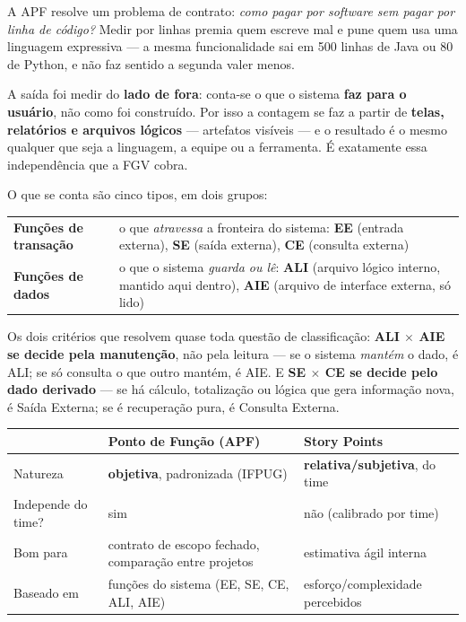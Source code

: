 \begin{conceito}
A APF resolve um problema de contrato: \emph{como pagar por software sem pagar
por linha de código?} Medir por linhas premia quem escreve mal e pune quem usa
uma linguagem expressiva --- a mesma funcionalidade sai em 500 linhas de Java
ou 80 de Python, e não faz sentido a segunda valer menos.

A saída foi medir do \textbf{lado de fora}: conta-se o que o sistema
\textbf{faz para o usuário}, não como foi construído. Por isso a contagem se
faz a partir de \textbf{telas, relatórios e arquivos lógicos} --- artefatos
visíveis --- e o resultado é o mesmo qualquer que seja a linguagem, a equipe
ou a ferramenta. É exatamente essa independência que a FGV cobra.

O que se conta são cinco tipos, em dois grupos:

\begin{center}
\begin{tabular}{@{}p{2.6cm}p{9.6cm}@{}}
\toprule
\textbf{Funções de transação} & o que \emph{atravessa} a fronteira do sistema:
\textbf{EE} (entrada externa), \textbf{SE} (saída externa), \textbf{CE}
(consulta externa) \\
\addlinespace
\textbf{Funções de dados} & o que o sistema \emph{guarda ou lê}: \textbf{ALI}
(arquivo lógico interno, mantido aqui dentro), \textbf{AIE} (arquivo de
interface externa, só lido) \\
\bottomrule
\end{tabular}
\end{center}

Os dois critérios que resolvem quase toda questão de classificação:
\textbf{ALI $\times$ AIE se decide pela manutenção}, não pela leitura --- se o
sistema \emph{mantém} o dado, é ALI; se só consulta o que outro mantém, é AIE.
E \textbf{SE $\times$ CE se decide pelo dado derivado} --- se há cálculo,
totalização ou lógica que gera informação nova, é Saída Externa; se é
recuperação pura, é Consulta Externa.
\end{conceito}

\begin{center}
\begin{tabular}{@{}p{2.8cm}p{4.7cm}p{4.7cm}@{}}
\toprule
& \textbf{Ponto de Função (APF)} & \textbf{Story Points} \\
\midrule
Natureza & \textbf{objetiva}, padronizada (IFPUG) & \textbf{relativa/subjetiva}, do time \\
Independe do time? & sim & não (calibrado por time) \\
Bom para & contrato de escopo fechado, comparação entre projetos & estimativa ágil interna \\
Baseado em & funções do sistema (EE, SE, CE, ALI, AIE) & esforço/complexidade percebidos \\
\bottomrule
\end{tabular}
\end{center}

